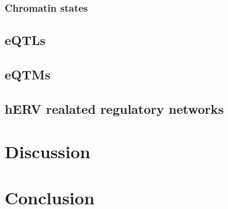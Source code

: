 \documentclass[a4paper,12pt]{article}
\begin{document}
\subsubsection{Chromatin states}

\subsection{eQTLs}

\subsection{eQTMs}

\subsection{hERV realated regulatory networks}

\newpage
\section{Discussion}

\newpage
\section{Conclusion}

\newpage
{}

\end{document}
